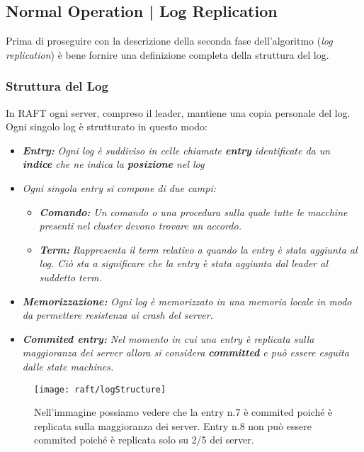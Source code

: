 \subsection{Normal Operation | Log Replication}
\label{Log Replication}
Prima di proseguire con la descrizione della seconda fase dell'algoritmo (\textit{log replication}) è bene fornire una definizione completa della struttura del log.
  \subsubsection{Struttura del Log}
  In RAFT ogni server, compreso il leader, mantiene una copia personale del log. Ogni singolo log è strutturato in questo modo:
  \begin{itemize}
    \item{\emph{\textbf{Entry:}}}
    \emph{Ogni log è suddiviso in celle chiamate \textbf{entry} identificate da un \textbf{indice} che ne indica la \textbf{posizione} nel log}
    \item{\emph{Ogni singola entry si compone di due campi:}}
      \begin{itemize}
        \item{\emph{\textbf{Comando:}}}
        \emph{Un comando o una procedura sulla quale tutte le macchine presenti nel cluster devono trovare un accordo.}
        \item{\emph{\textbf{Term:}}}
        \emph{Rappresenta il term relativo a quando la entry è stata aggiunta al log. Ciò sta a significare che la entry è stata aggiunta dal leader al suddetto term.}
      \end{itemize}
    \item{\emph{\textbf{Memorizzazione:}}}
    \emph{Ogni log è memorizzato in una memoria locale in modo da permettere resistenza ai crash del server.}
    \item{\emph{\textbf{Commited entry:}}}
    \emph{Nel momento in cui una entry è replicata sulla maggioranza dei server allora si considera \textbf{committed} e può essere esguita dalle state machines.}
  \end{itemize}
  \begin{figure}[H]
  	\centering
  	\texttt{[image: raft/logStructure]}
  	\caption{Nell'immagine possiamo vedere che la entry n.7 è commited poiché è replicata sulla maggioranza dei server. Entry n.8 non può essere commited poiché è replicata solo su 2/5 dei server.}
  	\label{fig:figure6}
  \end{figure}

